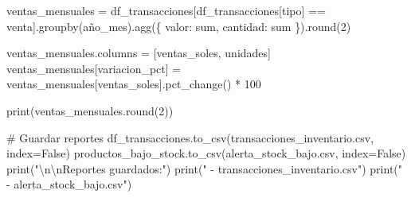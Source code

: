 \documentclass[
  doc,
  floatsintext,
  longtable,
  a4paper,
  nolmodern,
  notxfonts,
  notimes,
  12pt,
  colorlinks=true,linkcolor=blue,citecolor=blue,urlcolor=blue]{apa7}
\newenvironment{Shaded}{\begin{snugshade}}{\end{snugshade}}
\newcommand{\BuiltInTok}[1]{\textcolor[rgb]{0.00,0.23,0.31}{#1}}
\newcommand{\CharTok}[1]{\textcolor[rgb]{0.13,0.47,0.30}{#1}}
\newcommand{\CommentTok}[1]{\textcolor[rgb]{0.37,0.37,0.37}{#1}}
\newcommand{\DecValTok}[1]{\textcolor[rgb]{0.68,0.00,0.00}{#1}}
\newcommand{\NormalTok}[1]{\textcolor[rgb]{0.00,0.23,0.31}{#1}}
\newcommand{\OperatorTok}[1]{\textcolor[rgb]{0.37,0.37,0.37}{#1}}
\newcommand{\StringTok}[1]{\textcolor[rgb]{0.13,0.47,0.30}{#1}}
\newcommand{\VariableTok}[1]{\textcolor[rgb]{0.07,0.07,0.07}{#1}}
\begin{document}
\begin{Shaded}
\begin{Highlighting}[]
\NormalTok{ventas\_mensuales }\OperatorTok{=}\NormalTok{ df\_transacciones[df\_transacciones[}\StringTok{\textquotesingle{}tipo\textquotesingle{}}\NormalTok{] }\OperatorTok{==} \StringTok{\textquotesingle{}venta\textquotesingle{}}\NormalTok{].groupby(}\StringTok{\textquotesingle{}año\_mes\textquotesingle{}}\NormalTok{).agg(\{}
    \StringTok{\textquotesingle{}valor\textquotesingle{}}\NormalTok{: }\StringTok{\textquotesingle{}sum\textquotesingle{}}\NormalTok{,}
    \StringTok{\textquotesingle{}cantidad\textquotesingle{}}\NormalTok{: }\StringTok{\textquotesingle{}sum\textquotesingle{}}
\NormalTok{\}).}\BuiltInTok{round}\NormalTok{(}\DecValTok{2}\NormalTok{)}

\NormalTok{ventas\_mensuales.columns }\OperatorTok{=}\NormalTok{ [}\StringTok{\textquotesingle{}ventas\_soles\textquotesingle{}}\NormalTok{, }\StringTok{\textquotesingle{}unidades\textquotesingle{}}\NormalTok{]}
\NormalTok{ventas\_mensuales[}\StringTok{\textquotesingle{}variacion\_pct\textquotesingle{}}\NormalTok{] }\OperatorTok{=}\NormalTok{ ventas\_mensuales[}\StringTok{\textquotesingle{}ventas\_soles\textquotesingle{}}\NormalTok{].pct\_change() }\OperatorTok{*} \DecValTok{100}

\BuiltInTok{print}\NormalTok{(ventas\_mensuales.}\BuiltInTok{round}\NormalTok{(}\DecValTok{2}\NormalTok{))}

\CommentTok{\# Guardar reportes}
\NormalTok{df\_transacciones.to\_csv(}\StringTok{\textquotesingle{}transacciones\_inventario.csv\textquotesingle{}}\NormalTok{, index}\OperatorTok{=}\VariableTok{False}\NormalTok{)}
\NormalTok{productos\_bajo\_stock.to\_csv(}\StringTok{\textquotesingle{}alerta\_stock\_bajo.csv\textquotesingle{}}\NormalTok{, index}\OperatorTok{=}\VariableTok{False}\NormalTok{)}
\BuiltInTok{print}\NormalTok{(}\StringTok{"}\CharTok{\textbackslash{}n\textbackslash{}n}\StringTok{Reportes guardados:"}\NormalTok{)}
\BuiltInTok{print}\NormalTok{(}\StringTok{"  {-} transacciones\_inventario.csv"}\NormalTok{)}
\BuiltInTok{print}\NormalTok{(}\StringTok{"  {-} alerta\_stock\_bajo.csv"}\NormalTok{)}
\end{Highlighting}
\end{Shaded}
\end{document}
